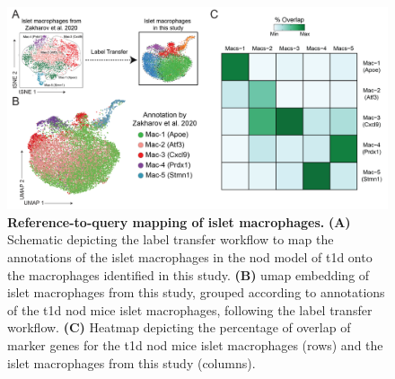 \vspace{-20pt}
\begin{figure}[H]
\centering
\includegraphics[width=13cm]{Chapter4/Fig/F2-5-02.png}
\caption[Reference-to-query mapping of islet macrophages]{\textbf{Reference-to-query mapping of islet macrophages.} \textbf{(A)} Schematic depicting the label transfer workflow to map the annotations of the islet macrophages in the \gls{nod} model of \gls{t1d} onto the macrophages identified in this study. \textbf{(B)} \gls{umap} embedding of islet macrophages from this study, grouped according to annotations of the \gls{t1d} \gls{nod} mice islet macrophages, following the label transfer workflow. \textbf{(C)} Heatmap depicting the percentage of overlap of marker genes for the \gls{t1d} \gls{nod} mice islet macrophages (rows) and the islet macrophages from this study (columns).}
\label{fig:chp2_scrna_macrophages_unanue}
\end{figure}

